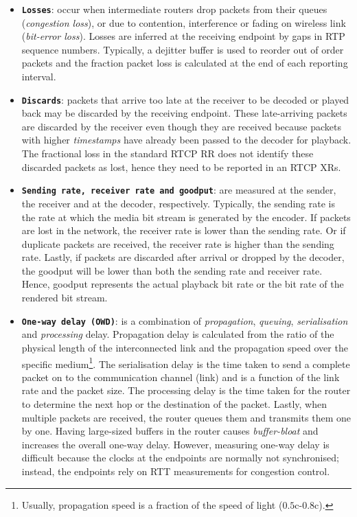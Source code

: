 \begin{itemize}
\setlength{\itemsep}{0pt}

\item \textbf{\texttt{Losses}}: occur when intermediate routers drop packets
from their queues (\emph{congestion loss}), or due to contention, interference
or fading on wireless link (\emph {bit-error loss}). Losses are inferred at
the receiving endpoint by gaps in RTP sequence numbers. Typically, a dejitter
buffer is used to reorder out of order packets and the fraction packet loss is
calculated at the end of each reporting interval.

\item \textbf{\texttt{Discards}}: packets that arrive too late at the receiver
to be decoded or played back may be discarded by the receiving endpoint. These
late-arriving packets are discarded by the receiver even though they are
received because packets with higher \textit{timestamps} have already been
passed to the decoder for playback. The fractional loss in the standard RTCP
RR does not identify these discarded packets as lost, hence they need to be
reported in an RTCP XRs.

\item \textbf{\texttt{Sending rate, receiver rate and goodput}}: are measured
at the sender, the receiver and at the decoder, respectively. Typically, the
sending rate is the rate at which the media bit stream is generated by the
encoder. If packets are lost in the network, the receiver rate is lower than
the sending rate. Or if duplicate packets are received, the receiver rate is
higher than the sending rate. Lastly, if packets are discarded after arrival
or dropped by the decoder, the goodput will be lower than both the sending
rate and receiver rate. Hence, goodput represents the actual playback bit rate
or the bit rate of the rendered bit stream.

\item \textbf{\texttt{One-way delay (OWD)}}: is a combination of
\emph{propagation}, \emph{queuing}, \emph{serialisation} and \emph{processing}
delay. Propagation delay is calculated from the ratio of the physical length
of the interconnected link and the propagation speed over the specific
medium\footnote{Usually, propagation speed is a fraction of the speed of light
($0.5$c-$0.8$c).}. The serialisation delay is the time taken to send a
complete packet on to the communication channel (link) and is a function of
the link rate and the packet size. The processing delay is the time taken for the
router to determine the next hop or the destination of the packet. Lastly,
when multiple packets are received, the router queues them and transmits them
one by one. Having large-sized buffers in the router causes \emph{buffer-bloat}
\cite{gettys:bufferbloat} and increases the overall one-way delay.
However, measuring one-way delay is difficult because the clocks at the
endpoints are normally not synchronised; instead, the endpoints rely on RTT
measurements for congestion control.


\end{itemize}
